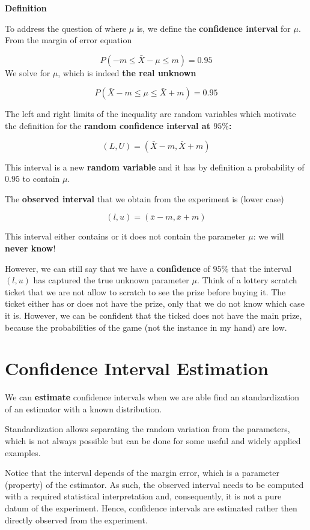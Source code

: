 \documentclass[
]{book}
\begin{document}
\textbf{Definition}

To address the question of where \(\mu\) is, we define the \textbf{confidence interval} for \(\mu\). From the margin of error equation

\[P(-m \leq \bar{X} - \mu \leq  m)=0.95\]
We solve for \(\mu\), which is indeed \textbf{the real unknown}

\[P(\bar{X} - m \leq \mu \leq \bar{X} + m)=0.95\]

The left and right limits of the inequality are random variables which motivate the definition for the \textbf{random confidence interval at \(95\%\):}

\[(L,U)=(\bar{X} - m,\bar{X} + m)\]

This interval is a new \textbf{random variable} and it has by definition a probability of \(0.95\) to contain \(\mu\).

The \textbf{observed interval} that we obtain from the experiment is (lower case)

\[(l,u)=(\bar{x} - m,\bar{x} + m)\]

This interval either contains or it does not contain the parameter \(\mu\): we will \textbf{never know}!

However, we can still say that we have a \textbf{confidence} of \(95\%\) that the interval \((l,u)\) has captured the true unknown parameter \(\mu\). Think of a lottery scratch ticket that we are not allow to scratch to see the prize before buying it. The ticket either has or does not have the prize, only that we do not know which case it is. However, we can be confident that the ticked does not have the main prize, because the probabilities of the game (not the instance in my hand) are low.

\hypertarget{confidence-interval-estimation}{%
\section{Confidence Interval Estimation}\label{confidence-interval-estimation}}

We can \textbf{estimate} confidence intervals when we are able find an standardization of an estimator with a known distribution.

Standardization allows separating the random variation from the parameters, which is not always possible but can be done for some useful and widely applied examples.

Notice that the interval depends of the margin error, which is a parameter (property) of the estimator. As such, the observed interval needs to be computed with a required statistical interpretation and, consequently, it is not a pure datum of the experiment. Hence, confidence intervals are estimated rather then directly observed from the experiment.
\end{document}
